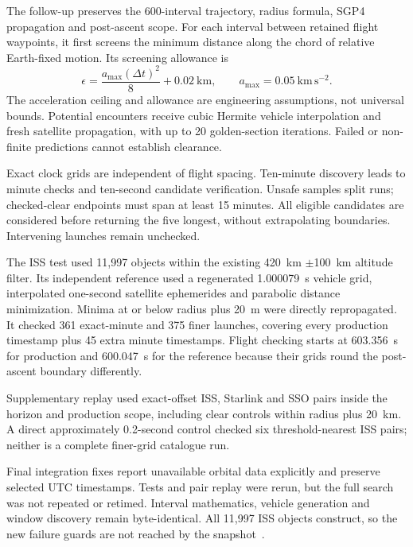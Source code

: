 \documentclass[11pt,a4paper]{article}
\begin{document}
The follow-up preserves the 600-interval trajectory, radius formula,
SGP4 propagation and post-ascent scope. For each interval between retained
flight waypoints, it first screens the minimum distance along the chord
of relative Earth-fixed motion. Its screening allowance is
\begin{equation}
  \epsilon = \frac{a_{\max}(\Delta t)^2}{8} + 0.02~\mathrm{km},
  \qquad a_{\max}=0.05~\mathrm{km\,s^{-2}}.
  \label{eq:allowance}
\end{equation}
The acceleration ceiling and allowance are engineering assumptions, not
universal bounds. Potential encounters receive cubic Hermite vehicle
interpolation and fresh satellite propagation, with up to 20 golden-section
iterations. Failed or non-finite predictions cannot establish clearance.

Exact clock grids are independent of flight spacing. Ten-minute discovery
leads to minute checks and ten-second candidate verification. Unsafe samples
split runs; checked-clear endpoints must span at least 15 minutes. All
eligible candidates are considered before returning the five longest,
without extrapolating boundaries. Intervening launches remain unchecked.

The ISS test used 11,997 objects within the existing 420~km $\pm$100~km
altitude filter. Its independent reference used a regenerated 1.000079~s
vehicle grid, interpolated one-second satellite ephemerides and parabolic
distance minimization. Minima at or below radius plus 20~m were directly
repropagated. It checked 361 exact-minute and 375 finer launches, covering
every production timestamp plus 45 extra minute timestamps. Flight checking
starts at 603.356~s for production and 600.047~s for the reference because
their grids round the post-ascent boundary differently.

Supplementary replay used exact-offset ISS, Starlink and SSO pairs inside
the horizon and production scope, including clear controls within radius
plus 20~km. A direct approximately 0.2-second control checked six
threshold-nearest ISS pairs; neither is a complete finer-grid catalogue run.

Final integration fixes report unavailable orbital data explicitly and
preserve selected UTC timestamps. Tests and pair replay were rerun, but
the full search was not repeated or retimed. Interval mathematics, vehicle
generation and window discovery remain byte-identical. All 11,997 ISS
objects construct, so the new failure guards are not reached by the
snapshot~\cite{opas_validation}.
\end{document}
